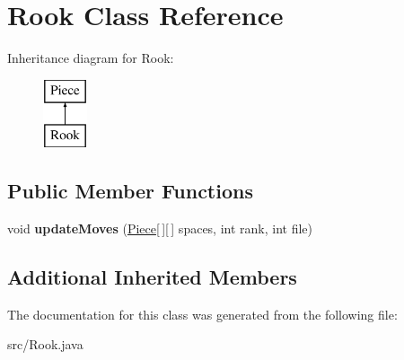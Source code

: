 \hypertarget{class_rook}{\section{Rook Class Reference}
\label{class_rook}
}
Inheritance diagram for Rook\-:\begin{figure}[H]
\begin{center}
\leavevmode
\includegraphics[height=2.000000cm]{class_rook}
\end{center}
\end{figure}
\subsection*{Public Member Functions}
\begin{DoxyCompactItemize}
\item 
\hypertarget{class_rook_ac9bc900686605e24c20fc5d437331934}{void {\bfseries update\-Moves} (\hyperlink{class_piece}{Piece}\mbox{[}$\,$\mbox{]}\mbox{[}$\,$\mbox{]} spaces, int rank, int file)}\label{class_rook_ac9bc900686605e24c20fc5d437331934}

\end{DoxyCompactItemize}
\subsection*{Additional Inherited Members}


The documentation for this class was generated from the following file\-:\begin{DoxyCompactItemize}
\item 
src/Rook.\-java\end{DoxyCompactItemize}
